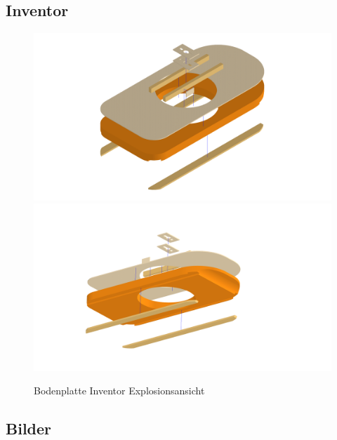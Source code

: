 \subsection{Inventor}
\begin{figure}[H]
    \centering
    \includegraphics[width=\textwidth]{../../../../Inventor/Bodenplatte/png/Bodenplatte_Praesentation_Hauptansicht.png}
    \includegraphics[width=\textwidth]{../../../../Inventor/Bodenplatte/png/Bodenplatte_Praesentation_SeitlichUnten.png}
    \label{fig:konst:bodenplatte:inventor}
    \caption{Bodenplatte Inventor Explosionsansicht}
\end{figure}

\subsection{Bilder}


